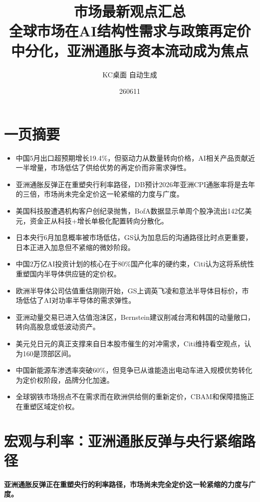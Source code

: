 \documentclass[11pt]{ctexart}
\title{\textbf{市场最新观点汇总}\\[0.4em]{\large 全球市场在AI结构性需求与政策再定价中分化，亚洲通胀与资本流动成为焦点}}
\author{KC桌面 自动生成}
\date{260611}
\begin{document}
\maketitle
\tableofcontents
\newpage
\section{一页摘要}
\begin{itemize}
  \item 中国5月出口超预期增长19.4\%，但驱动力从数量转向价格，AI相关产品贡献近一半增量，市场低估了供给优势的再定价而非需求弹性。
  \item 亚洲通胀反弹正在重塑央行利率路径，DB预计2026年亚洲CPI通胀率将是去年的三倍，市场尚未完全定价这一轮紧缩的力度与广度。
  \item 美国科技股遭遇机构客户创纪录抛售，BofA数据显示单周个股净流出142亿美元，资金正从科技+增长单极化配置转向分散化。
  \item 日本央行6月加息概率被市场低估，GS认为加息后的沟通路径比时点更重要，日本正进入加息但不紧缩的微妙阶段。
  \item 中国2万亿AI投资计划的核心在于80\%国产化率的硬约束，Citi认为这将系统性重塑国内半导体供应链的定价权。
  \item 欧洲半导体公司估值重估刚刚开始，GS上调英飞凌和意法半导体目标价，市场低估了AI对功率半导体的需求弹性。
  \item 亚洲动量交易已进入估值泡沫区，Bernstein建议削减台湾和韩国的动量敞口，转向高股息或低波动资产。
  \item 美元兑日元的真正支撑来自日本股市催生的对冲需求，Citi维持看空观点，认为160是顶部区间。
  \item 中国新能源车渗透率突破60\%，但竞争已从谁能造出电动车进入规模优势转化为定价权阶段，品牌分化加速。
  \item 全球钢铁市场拐点不在需求而在欧洲供给侧的重新定价，CBAM和保障措施正在重塑区域定价权。
\end{itemize}
\section{宏观与利率：亚洲通胀反弹与央行紧缩路径}
\textbf{亚洲通胀反弹正在重塑央行的利率路径，市场尚未完全定价这一轮紧缩的力度与广度。}
\end{document}
